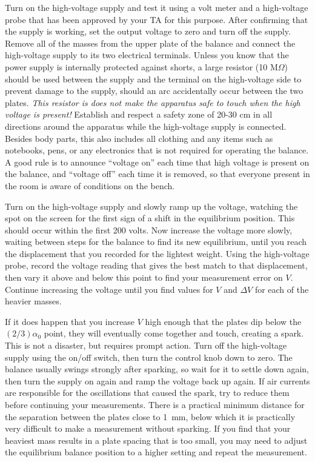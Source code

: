 \documentclass{revtex4}
\begin{document}
Turn on the high-voltage supply and test it using a volt meter and a
high-voltage probe that has been approved by your TA for this purpose.
After confirming that the supply is working, set the output voltage to
zero and turn off the supply.  Remove all of the masses from the upper
plate of the balance and connect the high-voltage supply to its two
electrical terminals.  Unless you know that the power supply is internally
protected against shorts, a large resistor (10 M$\Omega$) should be
used between the supply and the terminal on the high-voltage side to prevent
damage to the supply, should an arc accidentally occur between the two plates.
{\em This resistor is does not make the apparatus safe to touch when the high
voltage is present!}  Establish and respect a safety zone of 20-30 cm in
all directions around the apparatus while the high-voltage supply is
connected.  Besides body parts, this also includes all clothing and any
items such as notebooks, pens, or any electronics that is not required for
operating the balance.  A good rule is to announce ``voltage on'' each time
that high voltage is present on the balance, and ``voltage off'' each time
it is removed, so that everyone present in the room is aware of conditions on
the bench.

Turn on the high-voltage supply and slowly ramp up the voltage, watching
the spot on the screen for the first sign of a shift in the equilibrium
position.  This should occur within the first 200 volts.  Now increase the
voltage more slowly, waiting between steps for the balance to find its
new equilibrium, until you reach the displacement that you recorded for
the lightest weight.  Using the high-voltage probe, record the voltage
reading that gives the best match to that
displacement, then vary it above and below this point to find your
measurement error on $V$.  Continue increasing the voltage until you find
values for $V$ and $\Delta V$ for each of the heavier masses.

If it does happen that you increase $V$ high enough that the plates dip
below the $(2/3) \alpha_0$ point, they will eventually come together and
touch, creating a spark.  This is not a disaster, but requires prompt action.
Turn off the high-voltage supply using the on/off switch, then turn the
control knob down to zero.  The balance usually swings strongly after 
sparking, so wait for it to settle down again, then turn the supply on
again and ramp the voltage back up again.  If air currents are responsible
for the oscillations that caused the spark, try to reduce them before
continuing your measurements.  There is a practical minimum distance for
the separation between the plates close to 1~mm, below which it is
practically very difficult to make a measurement without sparking.  If
you find that your heaviest mass results in a plate spacing that is too
small, you may need to adjust the equilibrium balance position to a higher
setting and repeat the measurement.
\end{document}
